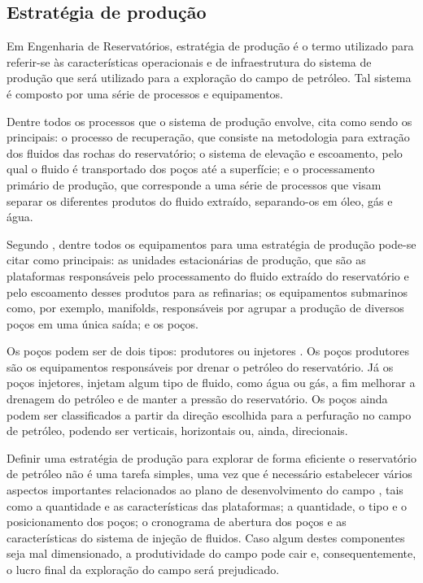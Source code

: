 \subsection{Estratégia de produção }

Em Engenharia de Reservatórios, estratégia de produção é o termo utilizado para referir-se às características operacionais e de infraestrutura do sistema de produção que será utilizado para a exploração do campo de petróleo. Tal sistema é composto por uma série de processos e equipamentos. 

Dentre todos os processos que o sistema de produção envolve,  cita como sendo os principais: o processo de recuperação, que consiste na metodologia para extração dos fluidos das rochas do reservatório; o sistema de elevação e escoamento, pelo qual o fluido é transportado dos poços até a superfície; e o processamento primário de produção, que corresponde a uma série de processos que visam separar os diferentes produtos do fluido extraído, separando-os em óleo, gás e água. 

Segundo , dentre todos os equipamentos para uma estratégia de produção pode-se citar como principais: as unidades estacionárias de produção, que são as plataformas responsáveis pelo processamento do fluido extraído do reservatório e pelo escoamento desses produtos para as refinarias; os equipamentos submarinos como, por exemplo, manifolds, responsáveis por agrupar a produção de diversos poços em uma única saída;  e os poços.

Os poços podem ser de dois tipos: produtores ou injetores \cite{Petrobras2015}. Os poços produtores são os equipamentos responsáveis por drenar o petróleo do reservatório. Já os poços injetores, injetam algum tipo de fluido, como água ou gás, a fim melhorar a drenagem do petróleo e de manter a pressão do reservatório. Os poços ainda podem ser classificados a partir da direção escolhida para a perfuração no campo de petróleo, podendo ser verticais, horizontais ou, ainda, direcionais.

Definir uma estratégia de produção para explorar de forma eficiente o reservatório de petróleo não é uma tarefa simples, uma vez que é necessário estabelecer vários aspectos importantes relacionados ao plano de desenvolvimento do campo \cite{Nogueira2009}, tais como a quantidade e as características das plataformas; a quantidade, o tipo e o posicionamento dos poços; o cronograma de abertura dos poços e as características do sistema de injeção de fluidos. Caso algum destes componentes seja mal dimensionado, a produtividade do campo pode cair e, consequentemente, o lucro final da exploração do campo será prejudicado.

